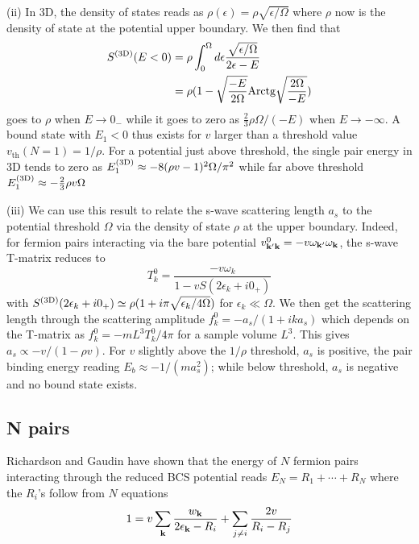 \documentclass[5p,twocolumn]{elsarticle}
\begin{document}
(ii) In 3D, the density of states reads as  
$\rho(\epsilon)=\rho\sqrt{\epsilon/\Omega}$
where $\rho$ now is the density of state at the potential upper boundary. We then find that
\begin{equation}
\begin{split}
S^{{\text{(3D)}}}(E<0)&=\rho\int_0^{\Omega}{}d\epsilon\frac{\sqrt{\epsilon/\Omega}}{2\epsilon-E}\\
	&=\rho(1-\sqrt{\frac{-E}{2\Omega}}\text{Arctg}\sqrt{\frac{2\Omega}{-E}})
\label{eq:}
\end{split}
\end{equation}
goes to $\rho$ when $E\rightarrow0_-$ while it goes to zero as $\frac{2}{3}\rho\Omega/(-E)$ when $E\rightarrow-\infty$. 
A bound state with $E_1<0$ thus exists for $v$ larger than a threshold value $v_{\text{th}}(N=1)=1/\rho$.  For a potential just above threshold, the single pair energy in 3D tends to zero as 
$
E_1^{{\text{(3D)}}}\approx-8(\rho v-1)^2\Omega/\pi^2
$
while far above threshold
$E_1^{{\text{(3D)}}}\approx-\frac{2}{3}\rho{v}\Omega$

(iii) We can use this result to relate the s-wave scattering length $a_{s}$ to the potential threshold $\Omega$ via the density of state $\rho$ at the upper boundary. Indeed, for fermion pairs interacting via the bare potential $v^{0}_{\mathbf{k}'\mathbf{k}}=-v \omega_{\mathbf{k}'}\omega_{\mathbf{k}}$, the s-wave T-matrix reduces to
\begin{equation}
T^{0}_{k}=\frac{-v\omega_k}{1-vS(2\epsilon_k+i0_+)}
\end{equation}
with $S^{{\text{(3D)}}}(2\epsilon_k+i0_+)\simeq\rho(1+i\pi\sqrt{\epsilon_k/4\Omega})$  for $\epsilon_k\ll\Omega$. We then get the scattering length through the scattering amplitude $f^0_k= -a_s/(1+ika_s)$ which depends on the T-matrix as $f^0_k= -mL^3T^{0}_{k}/4\pi$ for a sample volume $L^3$. This gives $a_s\propto -v/(1-\rho v)$. For $v$ slightly above the $1/\rho $ threshold, $a_s$ is positive, the pair binding energy reading $E_{b}\approx-1/(ma_s^{2})$; while below threshold, $a_s$ is negative and no bound state exists. 

\subsection{N pairs\label{sec:NPair}}
Richardson \cite{Richardson1} and Gaudin \cite{gaudin} have shown that the energy of $N$ fermion pairs interacting through the reduced BCS potential reads $E_N=R_1+\cdots+R_N$ where the $R_i$'s follow from $N$ equations
\begin{equation}
 1=v\sum_{\mathbf{k}}\frac{w_{\mathbf{k}}}{2\epsilon_{\mathbf{k}}-R_i}+\sum_{j\neq{}i}\frac{2v}{R_i-R_j}
\end{equation}
\end{document}
